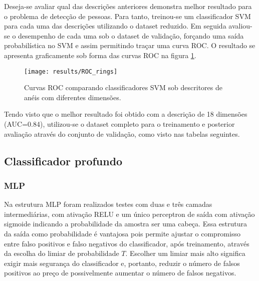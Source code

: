 \begin{table}[h!]
\end{table}

Deseja-se avaliar qual das descrições anteriores demonstra melhor resultado para o problema de detecção de pessoas. Para tanto, treinou-se um classificador SVM para cada uma das descrições utilizando o dataset reduzido. Em seguida avaliou-se o desempenho de cada uma sob o dataset de validação, forçando uma saída probabilística no SVM e assim permitindo traçar uma curva ROC. O resultado se apresenta graficamente sob forma das curvas ROC na figura \ref{fig:roc-rings}.

\begin{figure}[h]
\centering
\texttt{[image: results/ROC\_rings]}
\caption{Curvas ROC comparando classificadores SVM sob descritores de anéis com diferentes dimensões.}
\label{fig:roc-rings}
\end{figure}

Tendo visto que o melhor resultado foi obtido com a descrição de 18 dimensões (AUC=0.84), utilizou-se o dataset completo para o treinamento e posterior avaliação através do conjunto de validação, como visto nas tabelas seguintes.

\begin{table}[h!]
\end{table}

\subsection{Classificador profundo}

\subsubsection{MLP}
Na estrutura MLP foram realizados testes com duas e três camadas intermediárias, com ativação RELU e um único perceptron de saída com ativação sigmoide indicando a probabilidade da amostra ser uma cabeça. Essa estrutura da saída como probabilidade é vantajosa pois permite ajustar o compromisso entre falso positivos e falso negativos do classificador, após treinamento, através da escolha do limiar de probabilidade $T$. Escolher um limiar mais alto significa exigir mais segurança do classificador e, portanto, reduzir o número de falsos positivos ao preço de possivelmente aumentar o número de falsos negativos.

